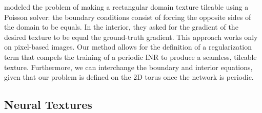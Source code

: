 \citet{perez2003} modeled the problem of making a rectangular domain texture tileable using a Poisson solver: the boundary conditions consist of forcing the opposite sides of the domain to be equals. In the interior, they asked for the gradient of the desired texture to be equal the ground-truth gradient.
This approach works only on pixel-based images.
Our method allows for the definition of a regularization term that compels the training of a periodic INR to produce a seamless, tileable texture. Furthermore, we can interchange the boundary and interior equations, given that our problem is defined on the 2D torus once the network is periodic.


\subsection{Neural Textures}




